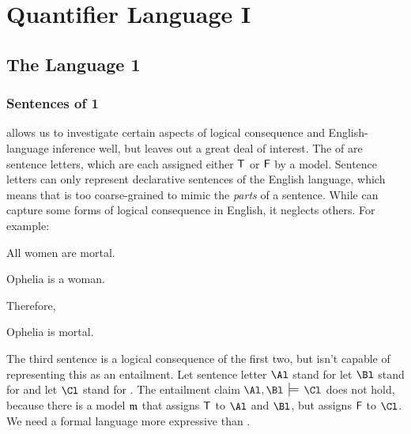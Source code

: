 
\chapter{Quantifier Language I}\label{quantifierlogic1}

\section{The Language \GQL{}1}


\subsection{Sentences of \GQL{}1}\label{Sec:GQLSymbols1}
\GSL{} allows us to investigate certain aspects of logical consequence and English-language inference well, but leaves out a great deal of interest.  The  of \GSL{} are sentence letters, which are each assigned either $\mathsf{T}$ or $\mathsf{F}$ by a model.  Sentence letters can only represent declarative sentences of the English language, which means that \GSL{} is too coarse-grained to mimic the \emph{parts} of a sentence.  While \GSL{} can capture some forms of logical consequence in English, it neglects others.  For example:

\begin{RESTARTmenumerate}
\item All women are mortal.
\item Ophelia is a woman.

Therefore,

\item Ophelia is mortal.
\end{RESTARTmenumerate}

\noindent{}The third sentence is a logical consequence of the first two, but \GSL{} isn't capable of representing this as an entailment.  Let sentence letter $\Al$ stand for  let $\Bl$ stand for  and let $\Cl$ stand for .  
The entailment claim $\Al, \Bl \:\sdtstile{}{}\: \Cl$ does not hold, because there is a model $\mathfrak{m}$ that assigns $\mathsf{T}$ to $\Al$ and $\Bl$, but assigns $\mathsf{F}$ to $\Cl$.  We need a formal language more expressive than \GSL{}.

